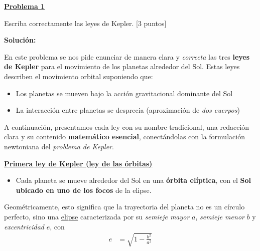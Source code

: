 \documentclass{article}
\newenvironment{AGbox}[1][7]%
{%
  \begin{tcolorbox}[
    enhanced, breakable,
    colframe=AppleGreen,
    colback=AppleGreen!#1,
    boxrule=1pt,
    borderline west={2mm}{-10mm}{AppleGreen},
    sharp corners=southwest,
    left=14pt,right=14pt,top=10pt,bottom=10pt,
     boxsep=6pt,
  ]%
}{%
  \end{tcolorbox}%
}
\begin{document}

\begin{AGbox}[8]
\textcolor{Apple Green}{\textbf{\underline{Problema 1}}} \vspace{2mm}

Escriba correctamente las leyes de Kepler. \hfill [3 puntos]

\end{AGbox}
\vspace{0.5cm}

\textcolor{Tuscany}{\textbf{Solución:}}

En este problema se nos pide enunciar de manera clara y \emph{correcta} las tres
\textcolor{Tarawera}{\textbf{leyes de Kepler}} para el movimiento de los planetas alrededor del Sol.  
Estas leyes describen el movimiento orbital suponiendo que:

\begin{itemize}
  \item[$\bullet$] Los planetas se mueven bajo la acción gravitacional dominante del Sol
  \item[$\bullet$] La interacción entre planetas se desprecia (aproximación de \emph{dos cuerpos})
\end{itemize}

A continuación, presentamos cada ley con su nombre tradicional, una redacción
clara y su contenido \textbf{matemático esencial}, conectándolas con la formulación
newtoniana del \emph{problema de Kepler}.

\vspace{0.4cm}

\noindent
\textcolor{Apple Green}{\textbf{\underline{Primera ley de Kepler (ley de las órbitas)}}}

\begin{itemize}
  \item[$\bullet$]
  Cada planeta se mueve alrededor del Sol en una \textcolor{Lochinvar}{\textbf{órbita elíptica}},
  con el \textcolor{Cinnabar}{\textbf{Sol ubicado en uno de los focos}} de la elipse.
\end{itemize}

Geométricamente, esto significa que la trayectoria del planeta no es un círculo
perfecto, sino una \underline{elipse} caracterizada por su \emph{semieje mayor} \(a\),
\emph{semieje menor} \(b\) y \emph{excentricidad} \(e\), con
\begin{equation}
\begin{split}
e &= \sqrt{1 - \frac{b^{2}}{a^{2}}}
\end{split}\label{eq:def_excentricidad}
\end{equation}
\end{document}
